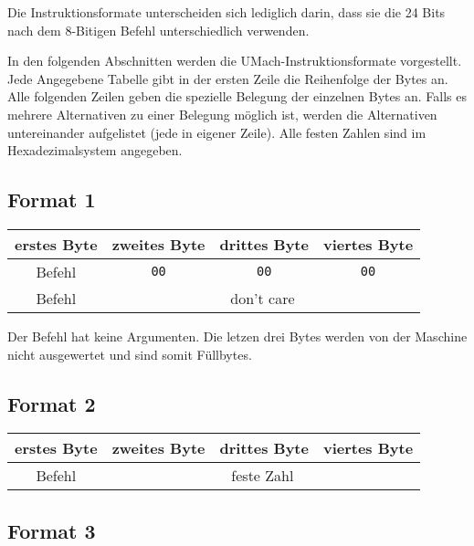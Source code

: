 Die Instruktionsformate unterscheiden sich lediglich darin, dass sie die 24 Bits
nach dem 8-Bitigen \gls{Befehl} unterschiedlich verwenden.

In den folgenden Abschnitten werden die UMach-Instruktionsformate vorgestellt.
Jede Angegebene Tabelle gibt in der ersten Zeile die Reihenfolge der Bytes an. 
Alle folgenden Zeilen geben die spezielle Belegung der einzelnen Bytes an.
Falls es mehrere Alternativen zu einer Belegung möglich ist, werden die
Alternativen untereinander aufgelistet (jede in eigener Zeile).
Alle festen Zahlen sind im Hexadezimalsystem angegeben.

\subsection{Format 1}

\begin{center}
  \begin{tabular}{|*{4}{c|}}
    \hline
    erstes Byte   & zweites Byte  & drittes Byte  & viertes Byte
    \\\hline\hline
    Befehl        & \texttt{00} & \texttt{00} & \texttt{00} 
    \\\hline
    Befehl        & \multicolumn{3}{c|}{don't care}
    \\\hline
  \end{tabular}
\end{center}

Der Befehl hat keine Argumenten. Die letzen drei Bytes werden von der Maschine
nicht ausgewertet und sind somit Füllbytes.

\subsection{Format 2}

\begin{center}
  \begin{tabular}{|*{4}{c|}}
    \hline
    erstes Byte   & zweites Byte  & drittes Byte  & viertes Byte
    \\\hline\hline
    Befehl        & \multicolumn{3}{c|}{feste Zahl}
    \\\hline
  \end{tabular}
\end{center}


\subsection{Format 3}

